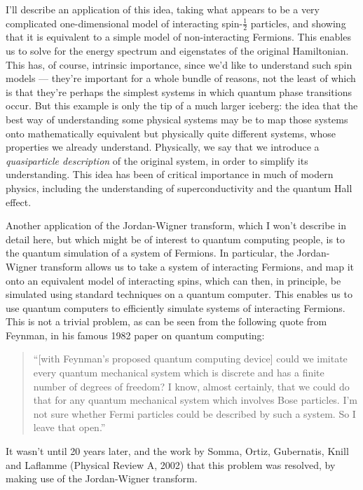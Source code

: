 \documentclass[12pt]{article}
\begin{document}
I'll describe an application of this idea, taking what appears to be a
very complicated one-dimensional model of interacting spin-$\frac 12$
particles, and showing that it is equivalent to a simple model of
non-interacting Fermions.  This enables us to solve for the energy
spectrum and eigenstates of the original Hamiltonian.  This has, of
course, intrinsic importance, since we'd like to understand such spin
models --- they're important for a whole bundle of reasons, not the
least of which is that they're perhaps the simplest systems in which
quantum phase transitions occur.  But this example is only the tip of
a much larger iceberg: the idea that the best way of understanding
some physical systems may be to map those systems onto mathematically
equivalent but physically quite different systems, whose properties we
already understand.  Physically, we say that we introduce a
\emph{quasiparticle description} of the original system, in order to
simplify its understanding.  This idea has been of critical importance
in much of modern physics, including the understanding of
superconductivity and the quantum Hall effect.

Another application of the Jordan-Wigner transform, which I won't
describe in detail here, but which might be of interest to quantum
computing people, is to the quantum simulation of a system of
Fermions.  In particular, the Jordan-Wigner transform allows us to
take a system of interacting Fermions, and map it onto an equivalent
model of interacting spins, which can then, in principle, be simulated
using standard techniques on a quantum computer.  This enables us to
use quantum computers to efficiently simulate systems of interacting
Fermions.  This is not a trivial problem, as can be seen from the
following quote from Feynman, in his famous 1982 paper on quantum
computing:
\begin{quote}
  ``[with Feynman's proposed quantum computing device] could we
  imitate every quantum mechanical system which is discrete and has a
  finite number of degrees of freedom?  I know, almost certainly, that
  we could do that for any quantum mechanical system which involves
  Bose particles.  I'm not sure whether Fermi particles could be
  described by such a system.  So I leave that open.''
\end{quote}
It wasn't until 20 years later, and the work by Somma, Ortiz,
Gubernatis, Knill and Laflamme (Physical Review A, 2002) that this
problem was resolved, by making use of the Jordan-Wigner transform.

\end{document}
